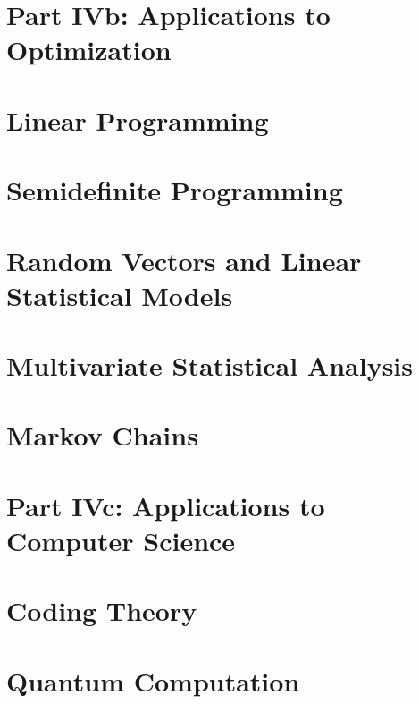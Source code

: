 \documentclass[a4paper]{article}
\begin{document}
\section*{Part IVb: Applications to Optimization}

\section{Linear Programming}

\section{Semidefinite Programming}

\section{Random Vectors and Linear Statistical Models}

\section{Multivariate Statistical Analysis}

\section{Markov Chains}

\section*{Part IVc: Applications to Computer Science}

\section{Coding Theory}

\section{Quantum Computation}
\end{document}
